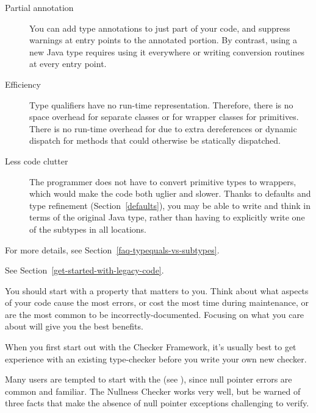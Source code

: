 \begin{description}
\item[Partial annotation]
  You can add type annotations to just part of your code, and suppress
  warnings at entry points to the annotated portion.  By contrast, using a
  new Java type requires using it everywhere or writing conversion routines
  at every entry point.

\item[Efficiency]
  Type qualifiers have no run-time representation.  Therefore, there is no
  space overhead for separate classes or for wrapper classes for
  primitives.  There is no run-time overhead for due to extra dereferences
  or dynamic dispatch for methods that could otherwise be statically
  dispatched.

\item[Less code clutter]
  The programmer does not have to convert primitive types to wrappers,
  which would make the code both uglier and slower.  Thanks to defaults and
  type refinement (Section~\ref{defaults}),
  you may be able to write and think in terms of the
  original Java type, rather than having to explicitly write one of the
  subtypes in all locations.

\end{description}


For more details, see Section~\ref{faq-typequals-vs-subtypes}.





See Section~\ref{get-started-with-legacy-code}.



You should start with a property that matters to you.  Think about what
aspects of your code cause the most errors, or cost the most time during
maintenance, or are the most common to be incorrectly-documented.  Focusing
on what you care about will give you the best benefits.

When you first start out with the Checker Framework, it's usually best to
get experience with an existing type-checker before you write your own new
checker.

Many users are tempted to start with the
 (see
), since null pointer errors are common
and familiar.  The Nullness Checker works very well, but be warned of three
facts that make the absence of null pointer exceptions challenging to
verify.


